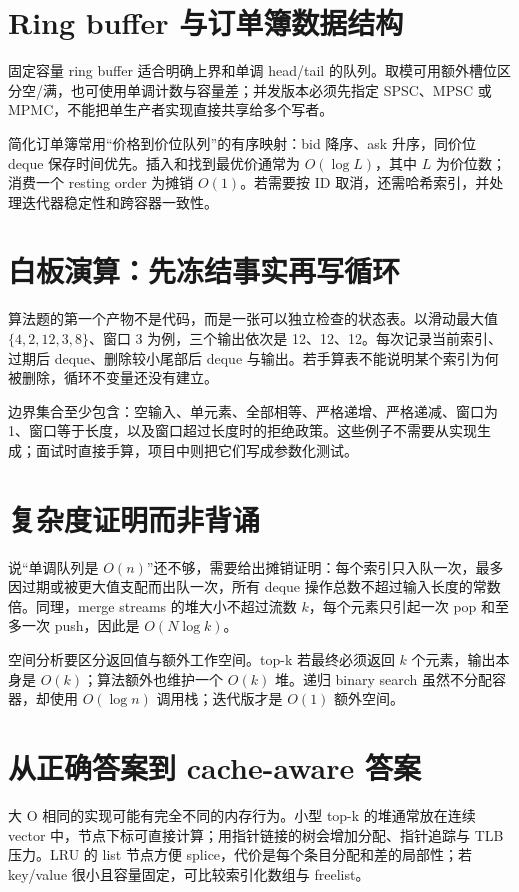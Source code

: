 \section{Ring buffer 与订单簿数据结构}

固定容量 ring buffer 适合明确上界和单调 head/tail 的队列。取模可用额外槽位区分空/满，也可使用单调计数与容量差；并发版本必须先指定 SPSC、MPSC 或 MPMC，不能把单生产者实现直接共享给多个写者。

简化订单簿常用“价格到价位队列”的有序映射：bid 降序、ask 升序，同价位 deque 保存时间优先。插入和找到最优价通常为 \(O(\log L)\)，其中 \(L\) 为价位数；消费一个 resting order 为摊销 \(O(1)\)。若需要按 ID 取消，还需哈希索引，并处理迭代器稳定性和跨容器一致性。

\section{白板演算：先冻结事实再写循环}

算法题的第一个产物不是代码，而是一张可以独立检查的状态表。以滑动最大值 \(\{4,2,12,3,8\}\)、窗口 3 为例，三个输出依次是 12、12、12。每次记录当前索引、过期后 deque、删除较小尾部后 deque 与输出。若手算表不能说明某个索引为何被删除，循环不变量还没有建立。

边界集合至少包含：空输入、单元素、全部相等、严格递增、严格递减、窗口为 1、窗口等于长度，以及窗口超过长度时的拒绝政策。这些例子不需要从实现生成；面试时直接手算，项目中则把它们写成参数化测试。

\section{复杂度证明而非背诵}

说“单调队列是 \(O(n)\)”还不够，需要给出摊销证明：每个索引只入队一次，最多因过期或被更大值支配而出队一次，所有 deque 操作总数不超过输入长度的常数倍。同理，merge streams 的堆大小不超过流数 \(k\)，每个元素只引起一次 pop 和至多一次 push，因此是 \(O(N\log k)\)。

空间分析要区分返回值与额外工作空间。top-k 若最终必须返回 \(k\) 个元素，输出本身是 \(O(k)\)；算法额外也维护一个 \(O(k)\) 堆。递归 binary search 虽然不分配容器，却使用 \(O(\log n)\) 调用栈；迭代版才是 \(O(1)\) 额外空间。

\section{从正确答案到 cache-aware 答案}

大 O 相同的实现可能有完全不同的内存行为。小型 top-k 的堆通常放在连续 vector 中，节点下标可直接计算；用指针链接的树会增加分配、指针追踪与 TLB 压力。LRU 的 list 节点方便 splice，代价是每个条目分配和差的局部性；若 key/value 很小且容量固定，可比较索引化数组与 freelist。

